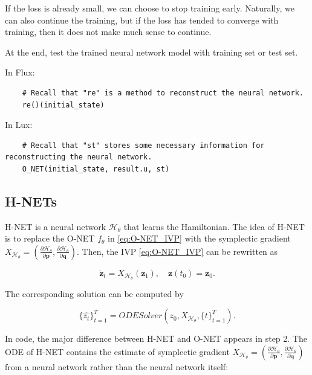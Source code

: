 \documentclass[
	parskip, 			   %
	twoside, 			   %
	DIV=14, 			   %
	BCOR=15.0mm, 		   %
	headsepline, 		   %
	open=right, 		   %
	captions=tableheading, %
	bibliography=totoc,    %
	numbers=noenddot       %
]{scrreprt}
\begin{document}
If the loss is already small, we can choose to stop training early. Naturally, we can also continue the training, but if the loss has tended to converge with training, then it does not make much sense to continue.

At the end, test the trained neural network model with training set or test set.

In Flux:
\begin{verbatim}
    # Recall that "re" is a method to reconstruct the neural network.
    re()(initial_state)
\end{verbatim}

In Lux:
\begin{verbatim}
    # Recall that "st" stores some necessary information for reconstructing the neural network.
    O_NET(initial_state, result.u, st)
\end{verbatim}


\subsection{H-NETs}
H-NET is a neural network $\mathcal{H}_{\theta}$ that learns the Hamiltonian. The idea of H-NET is to replace the O-NET $f_{\theta}$ in \ref{eq:O-NET_IVP} with the symplectic gradient $X_{\mathcal{H}_{\theta}}=(\frac{\partial \mathcal{H}_{\theta}}{\partial \mathbf{p}}, \frac{\partial \mathcal{H}_{\theta}}{\partial \mathbf{q}})$. Then, the IVP \ref{eq:O-NET_IVP} can be rewritten as

\begin{equation}
    \label{eq:H-NET_IVP}
    \dot{\mathbf{z}}_t = X_{\mathcal{H}_{\theta}}(\mathbf{z_t}), \quad \mathbf{z}(t_{0}) = \mathbf{z}_{0}.
\end{equation}

The corresponding solution can be computed by

\begin{equation}
    \label{eq:H-NET_ODESolver}
    \{ \hat{z_{t}} \}_{t=1}^{T} = ODESolver(z_{0}, X_{\mathcal{H}_{\theta}}, \{ t \}_{t=1}^{T}).
\end{equation}

In code, the major difference between H-NET and O-NET appears in step 2. The ODE of H-NET contains the estimate of symplectic gradient $X_{\mathcal{H}_{\theta}}=(\frac{\partial \mathcal{H}_{\theta}}{\partial \mathbf{p}}, \frac{\partial \mathcal{H}_{\theta}}{\partial \mathbf{q}})$ from a neural network rather than the neural network itself:
\end{document}
